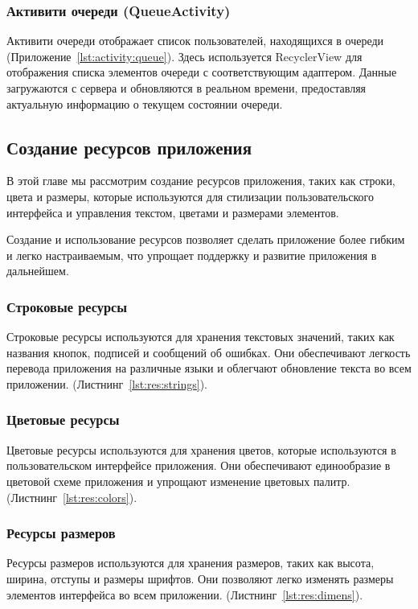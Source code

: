 \subsubsection{Активити очереди (QueueActivity)}
Активити очереди отображает список пользователей, находящихся в очереди
(Приложение~\ref{lst:activity:queue}).
Здесь используется RecyclerView для отображения списка элементов очереди
с соответствующим адаптером.
Данные загружаются с сервера и обновляются в реальном времени,
предоставляя актуальную информацию о текущем состоянии очереди.

\subsection{Создание ресурсов приложения}

В этой главе мы рассмотрим создание ресурсов приложения,
таких как строки, цвета и размеры, которые используются
для стилизации пользовательского интерфейса и управления текстом,
цветами и размерами элементов.\par
Создание и использование ресурсов позволяет сделать приложение более гибким
и легко настраиваемым, что упрощает поддержку
и развитие приложения в дальнейшем.

\subsubsection{Строковые ресурсы}
Строковые ресурсы используются для хранения текстовых значений,
таких как названия кнопок, подписей и сообщений об ошибках.
Они обеспечивают легкость перевода приложения на различные языки
и облегчают обновление текста во всем приложении.
(Листнинг~\ref{lst:res:strings}).

\subsubsection{Цветовые ресурсы}
Цветовые ресурсы используются для хранения цветов,
которые используются в пользовательском интерфейсе приложения.
Они обеспечивают единообразие в цветовой схеме приложения
и упрощают изменение цветовых палитр.
(Листнинг~\ref{lst:res:colors}).

\subsubsection{Ресурсы размеров}
Ресурсы размеров используются для хранения размеров,
таких как высота, ширина, отступы и размеры шрифтов.
Они позволяют легко изменять размеры элементов интерфейса во всем приложении.
(Листнинг~\ref{lst:res:dimens}).

